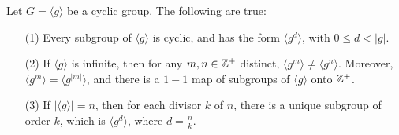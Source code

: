 \begin{theorem}\label{theorem_2.3.8}
  Let $G=\langle g \rangle$ be a cyclic group. The following are true:
  \begin{enumerate}
    \item[(1)] Every subgroup of $\langle g \rangle$ is cyclic, and has the form
      $\langle g^d \rangle$, with $0 \leq d < |g|$.

    \item[(2)] If $\langle g \rangle$ is infinite, then for any $m,n \in \mathbb{Z}^+$
      distinct,  $\langle g^m \rangle \neq \langle g^n \rangle$. Moreover,
      $\langle g^m \rangle=\langle g^{|m|} \rangle$, and there is a $1-1$ map of
      subgroups of $\langle g \rangle$ onto $\mathbb{Z}^+$.

    \item[(3)] If $|\langle g \rangle|=n$, then for each divisor $k$ of  $n$,
      there is a unique subgroup of order  $k$, which is  $\langle g^d
      \rangle$, where $d=\frac{n}{k}$.
  \end{enumerate}
\end{theorem}
